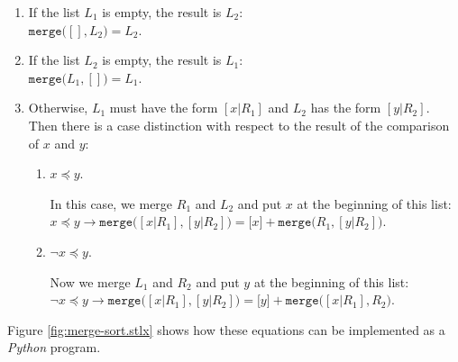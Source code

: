 \begin{enumerate}
\item If the list $L_1$ is empty, the result is $L_2$: \\[0.2cm]
      \hspace*{1.3cm} 
      $\mathtt{merge}\bigl([], L_2\bigr) = L_2$.
\item If the list $L_2$  is empty, the result is $L_1$: \\[0.2cm]
      \hspace*{1.3cm} 
      $\mathtt{merge}\bigl(L_1, []\bigr) = L_1$.
\item Otherwise, $L_1$ must have the form $[x|R_1]$ and $L_2$ has the form $[y|R_2]$.
      Then there is a case distinction with respect to the result of the comparison of $x$ and $y$:
      \begin{enumerate}
      \item $x \preceq y$.

            In this case, we merge $R_1$ and $L_2$ and put $x$ at the beginning of this list:
            \\[0.2cm]
            \hspace*{1.3cm} 
            $x \preceq y \rightarrow \mathtt{merge}\bigl([x|R_1], [y|R_2]\bigr) = \bigl[x\bigr] + \mathtt{merge}\bigl(R_1,[y|R_2]\bigr)$.
      \item $\neg x \preceq y$.

            Now we merge $L_1$ and $R_2$ and put $y$ at the beginning of this list:
            \\[0.2cm]
            \hspace*{1.3cm} 
            $\neg x \preceq y \rightarrow \mathtt{merge}\bigl([x|R_1], [y|R_2]\bigr) = \bigl[y \bigr] + \mathtt{merge}\bigl([x|R_1],R_2\bigr)$.
      \end{enumerate}
\end{enumerate}

Figure \ref{fig:merge-sort.stlx} shows how these equations can be implemented as a \textsl{Python}
program.  

